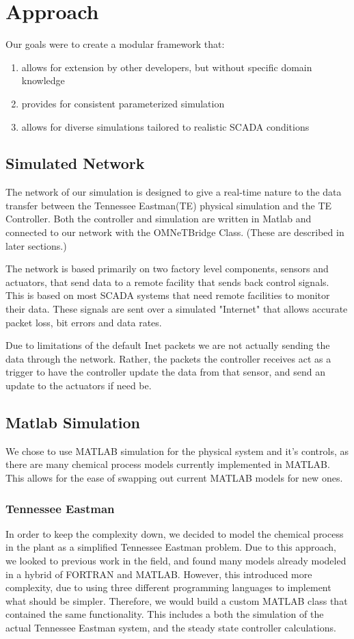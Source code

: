 \section{Approach}
Our goals were to create a modular framework that:
\begin{enumerate}
\item allows for extension by other developers, but without specific domain knowledge
\item provides for consistent parameterized simulation
\item allows for diverse simulations tailored to realistic SCADA conditions
\end{enumerate}
\subsection{Simulated Network}

The network of our simulation is designed to give a real-time nature to the data transfer 
between the Tennessee Eastman(TE) physical simulation and the TE Controller. 
Both the controller and simulation are written in Matlab and connected to our network with 
the OMNeTBridge Class. (These are described in later sections.)

The network is based primarily on two factory level components, sensors and actuators, that 
send data to a remote facility that sends back control signals. This is based on most SCADA 
systems that need remote facilities to monitor their data. These signals are sent over a 
simulated "Internet" that allows accurate packet loss, bit errors and data rates. 

Due to limitations of the default Inet packets we are not actually sending the data through 
the network. Rather, the packets the controller receives act as a trigger to have the 
controller update the data from that sensor, and send an update to the actuators if need be. 

\subsection{Matlab Simulation}
We chose to use MATLAB simulation for the physical system and it's controls, as there are 
many chemical process models currently implemented in MATLAB. This allows for the ease of 
swapping out current MATLAB models for new ones.

\subsubsection{Tennessee Eastman}
 In order to keep the complexity down, we decided to model the chemical process in the plant 
 as a simplified Tennessee Eastman problem. Due to this approach, we looked 
 to previous work in the field, and found many models already modeled in a hybrid of FORTRAN 
 and MATLAB.  However, this introduced more complexity, due to using three different 
 programming languages to implement what should be simpler.  Therefore, we would build a 
 custom MATLAB class that contained the same functionality.  This includes a both the 
 simulation of the actual Tennessee Eastman system, and the steady state controller 
 calculations.


